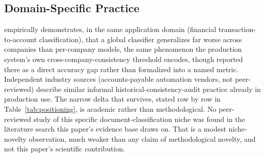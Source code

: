 \documentclass[11pt]{article}
\begin{document}
\subsection{Domain-Specific Practice}
\label{sec:domain-practice}

\citet{jorgensenigel2021} empirically demonstrates, in the same application
domain (financial transaction-to-account classification), that a global
classifier generalizes far worse across companies than per-company models,
the same phenomenon the production system's own cross-company-consistency
threshold encodes, though reported there as a direct accuracy gap rather than
formalized into a named metric. Independent industry sources (accounts-payable
automation vendors, not peer-reviewed) \citep{kenfromfinance2025,peakflo2025,ramp2025} describe
similar informal historical-consistency-audit practice already in production
use. The narrow delta that survives, stated row by row in
Table~\ref{tab:positioning}, is academic rather than methodological. No
peer-reviewed study of this specific document-classification niche was found
in the literature search this paper's evidence base draws on. That is a
modest niche-novelty observation, much weaker than any claim of
methodological novelty, and not
this paper's scientific contribution.
\end{document}
